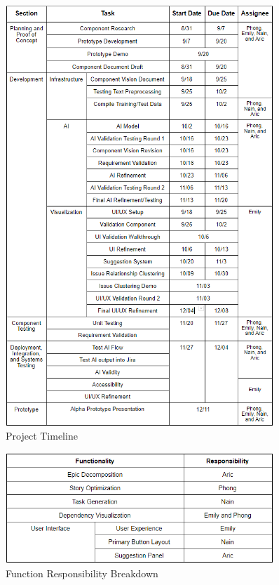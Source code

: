 \begin{figure}
\centering
\includegraphics[width=0.9\textwidth,keepaspectratio]{./figure/ProjectTimeline.png}
\caption{Project Timeline}
\label{fig:timeline}
\end{figure}

\begin{figure}
\centering
\includegraphics[width=0.9\textwidth,keepaspectratio]{./figure/FunctionResponsibility.png}
\caption{Function Responsibility Breakdown}
\label{fig:responsibility}
\end{figure}